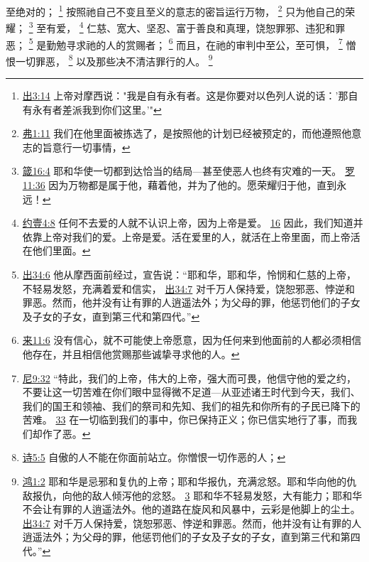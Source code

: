\documentclass[12pt, a4paper, oneside]{ctexart}
\begin{document}
	至绝对的；
	\footnote {
		\href{https://biblehub.com/exodus/3-14.htm}{出3:14} 上帝对摩西说："我是自有永有者。这是你要对以色列人说的话：'那自有永有者差派我到你们这里。'"
	}
	按照祂自己不变且至义的意志的密旨运行万物，
	\footnote {
		\href{https://biblehub.com/ephesians/1-11.htm}{弗1:11} 我们在他里面被拣选了，是按照他的计划已经被预定的，而他遵照他意志的旨意行一切事情，
	}
	只为他自己的荣耀；
	\footnote {
		\href{https://biblehub.com/proverbs/16-4.htm}{箴16:4} 耶和华使一切都到达恰当的结局---甚至使恶人也终有灾难的一天。
		\href{https://biblehub.com/romans/11-36.htm}{罗11:36} 因为万物都是属于他，藉着他，并为了他的。愿荣耀归于他，直到永远！
	}
	至有爱，
	\footnote {
		\href{https://biblehub.com/1_john/4-8.htm}{约壹4:8} 任何不去爱的人就不认识上帝，因为上帝是爱。
		\href{https://biblehub.com/1_john/4-16.htm}{16} 因此，我们知道并依靠上帝对我们的爱。上帝是爱。活在爱里的人，就活在上帝里面，而上帝活在他们里面。
	}
	仁慈、宽大、坚忍、富于善良和真理，饶恕罪邪、违犯和罪恶；
	\footnote {
		\href{https://biblehub.com/exodus/34-6.htm}{出34:6} 他从摩西面前经过，宣告说：“耶和华，耶和华，怜悯和仁慈的上帝，不轻易发怒，充满着爱和信实，
		\href{https://biblehub.com/exodus/34-7.htm}{出34:7} 对千万人保持爱，饶恕邪恶、悖逆和罪恶。然而，他并没有让有罪的人逍遥法外；为父母的罪，他惩罚他们的子女及子女的子女，直到第三代和第四代。”
	}
	是勤勉寻求祂的人的赏赐者；
	\footnote {
		\href{https://biblehub.com/hebrews/11-6.htm}{来11:6} 没有信心，就不可能使上帝愿意，因为任何来到他面前的人都必须相信他存在，并且相信他赏赐那些诚挚寻求他的人。
	}
	而且，在祂的审判中至公，至可惧，
	\footnote {
		\href{https://biblehub.com/nehemiah/9-32.htm}{尼9:32} “特此，我们的上帝，伟大的上帝，强大而可畏，他信守他的爱之约，不要让这一切苦难在你们眼中显得微不足道---从亚述诸王时代到今天，我们、我们的国王和领袖、我们的祭司和先知、我们的祖先和你所有的子民已降下的苦难。
		\href{https://biblehub.com/nehemiah/9-33.htm}{33} 在一切临到我们的事中，你已保持正义；你已信实地行了事，而我们却作了恶。
	}
	憎恨一切罪恶，
	\footnote {
		\href{https://biblehub.com/psalms/5-5.htm}{诗5:5} 自傲的人不能在你面前站立。你憎恨一切作恶的人；
	}
	以及那些决不清洁罪行的人。
	\footnote {
		\href{https://biblehub.com/nahum/1-2.htm}{鸿1:2} 耶和华是忌邪和复仇的上帝；耶和华报仇，充满忿怒。耶和华向他的仇敌报仇，向他的敌人倾泻他的忿怒。
		\href{https://biblehub.com/nahum/1-3.htm}{3} 耶和华不轻易发怒，大有能力；耶和华不会让有罪的人逍遥法外。他的道路在旋风和风暴中，云彩是他脚上的尘土。
		\href{https://biblehub.com/exodus/34-7.htm}{出34:7} 对千万人保持爱，饶恕邪恶、悖逆和罪恶。然而，他并没有让有罪的人逍遥法外；为父母的罪，他惩罚他们的子女及子女的子女，直到第三代和第四代。”
	}
\end{document}

